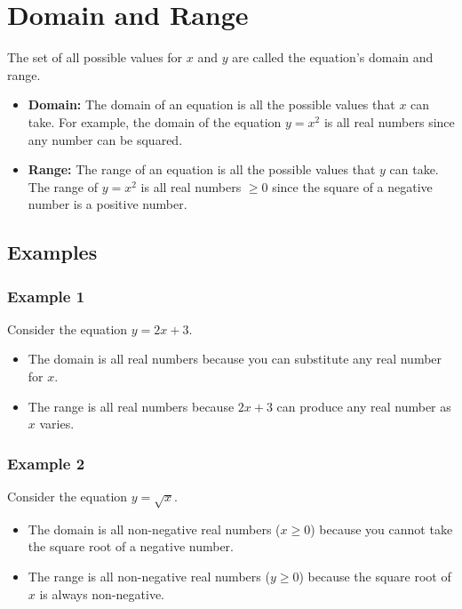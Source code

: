 \documentclass[12pt]{article}
\begin{document}
\newpage

\section*{Domain and Range}
The set of all possible values for $x$ and $y$ are called the equation's domain and range.  

\begin{itemize}
\item \textbf{Domain:} The domain of an equation is all the possible values that \( x \) can take. For example, the domain of the equation $y=x^2$ is all real numbers since any number can be squared.
\item \textbf{Range:} The range of an equation is all the possible values that \( y \) can take. The range of $y=x^2$ is all real numbers $\geq 0$ since the square of a negative number is a positive number.
\end{itemize}

\subsection*{Examples}

\subsubsection*{Example 1}

Consider the equation \( y = 2x + 3 \).

\begin{itemize}
    \item The domain is all real numbers because you can substitute any real number for \( x \).
    \item The range is all real numbers because \( 2x + 3 \) can produce any real number as \( x \) varies.
\end{itemize}

\subsubsection*{Example 2}

Consider the equation \( y = \sqrt{x} \).

\begin{itemize}
    \item The domain is all non-negative real numbers (\( x \geq 0 \)) because you cannot take the square root of a negative number.
    \item The range is all non-negative real numbers (\( y \geq 0 \)) because the square root of \( x \) is always non-negative.
\end{itemize}
\end{document}
